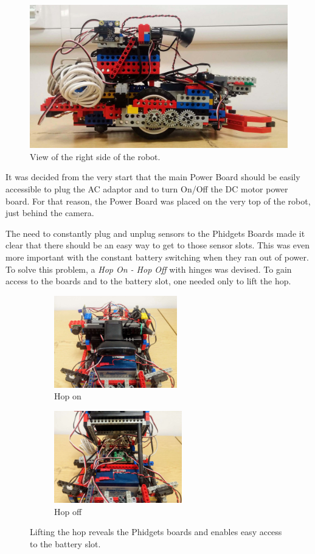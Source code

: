 \bigskip

\begin{figure}[ht]
    \centering
    \includegraphics[width=0.7\linewidth]{res/robot-pics/view-right-side.jpg}
    \caption{View of the right side of the robot.}
\end{figure}

\clearpage

It was decided from the very start that the main Power Board should be easily accessible to plug the AC adaptor and to turn On/Off the DC motor power board. For that reason, the Power Board was placed on the very top of the robot, just behind the camera.

The need to constantly plug and unplug sensors to the Phidgets Boards made it clear that there should be an easy way to get to those sensor slots. This was even more important with the constant battery switching when they ran out of power. To solve this problem, a \textit{Hop On - Hop Off} with hinges was devised. To gain access to the boards and to the battery slot, one needed only to lift the hop.

\bigskip

\begin{figure}[ht]
    \centering
    \begin{subfigure}{0.49\textwidth}
        \includegraphics[width=\linewidth, height=4cm]{res/robot-pics/top-on.jpg}
        \caption{Hop on}
        \label{fig:hop-on}
    \end{subfigure}
    \begin{subfigure}{0.49\textwidth}
        \includegraphics[width=\linewidth, height=4cm]{res/robot-pics/top-off.jpg}
        \caption{Hop off}
        \label{fig:hop-off}
    \end{subfigure}
    \caption{Lifting the hop reveals the Phidgets boards and enables easy access to the battery slot.}
    \label{fig:hop-on-off}
\end{figure}

